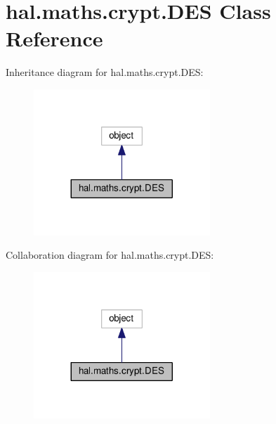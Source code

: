 \hypertarget{classhal_1_1maths_1_1crypt_1_1_d_e_s}{}\section{hal.\+maths.\+crypt.\+D\+ES Class Reference}
\label{classhal_1_1maths_1_1crypt_1_1_d_e_s}


Inheritance diagram for hal.\+maths.\+crypt.\+D\+ES\+:\nopagebreak
\begin{figure}[H]
\begin{center}
\leavevmode
\includegraphics[width=188pt]{classhal_1_1maths_1_1crypt_1_1_d_e_s__inherit__graph}
\end{center}
\end{figure}


Collaboration diagram for hal.\+maths.\+crypt.\+D\+ES\+:\nopagebreak
\begin{figure}[H]
\begin{center}
\leavevmode
\includegraphics[width=188pt]{classhal_1_1maths_1_1crypt_1_1_d_e_s__coll__graph}
\end{center}
\end{figure}
